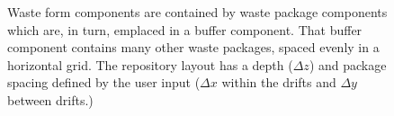 
\begin{figure}[htbp!]
\begin{center}
\def\svgwidth{.5\textwidth}

\end{center}
\caption{Waste form components are contained by waste package components which 
        are, in turn, emplaced in a buffer component. That buffer component 
        contains many other waste packages, spaced evenly in a horizontal grid.  The 
        repository layout has a depth ($\Delta z$) and package spacing defined 
        by the user input ($\Delta x$ within the drifts and $\Delta y$ between 
        drifts.)}
\label{fig:repo_layout}
\end{figure}
